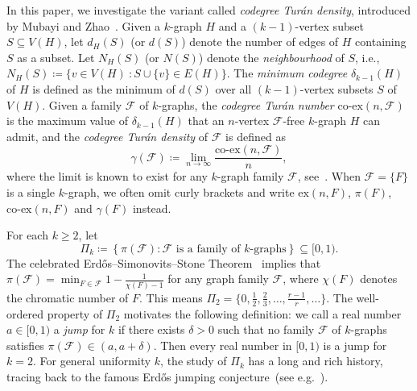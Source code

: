 \documentclass[11pt,a4paper]{article}
\theoremstyle{remark}
\newcommand{\C}[1]{\mathcal{#1}}
\def\ex{\mathrm{ex}}
\def\coex{\mathrm{co\mbox{-}ex}}
\begin{document}
In this paper, we investigate the variant called \emph{codegree Tur\'an density}, introduced by Mubayi and Zhao~\cite{MZ07}. 
Given a $k$-graph $H$ and a $(k-1)$-vertex subset $S\subseteq V(H)$, let $d_H(S)$ (or $d(S)$) denote the number of edges of $H$ containing $S$ as a subset. Let $N_H(S)$ (or $N(S)$) denote the \emph{neighbourhood} of $S$, i.e., $N_H(S)\coloneqq\{ v \in V(H)\ : S\cup \{v\}\in E(H)\}$.
The \textit{minimum codegree} $\delta_{k-1}(H)$ of $H$ is defined as the minimum of $d(S)$ over all $(k-1)$-vertex subsets $S$ of $V(H)$. Given a family $\C F$ of $k$-graphs, the \emph{codegree Tur\'an number} $\coex(n,\C F)$ is the maximum value of $\delta_{k-1}(H)$ that an $n$-vertex $\C F$-free $k$-graph $H$ can admit, and the \emph{codegree Tur\'an density} of $\C F$ is defined as
\[
\gamma(\C F)\coloneqq\lim_{n\to \infty}\frac{\coex(n,\C F)}{n},
\]
where the limit is known to exist for any $k$-graph family $\C F$, see~\cite[Proposition 1.2]{MZ07}. 
When $\C F=\{F\}$ is a single $k$-graph, we often omit curly brackets and write $\ex(n,F)$, $\pi(F)$, $\coex(n,F)$ and $\gamma(F)$ instead. 



For each $k\ge 2$, let
\[
\Pi_k\coloneqq \left\{\pi(\C F) \colon \text{$\C F$ is a family of $k$-graphs}\right\}\subseteq [0,1).
\]
The celebrated Erd\H{o}s--Simonovits--Stone Theorem~\cite{ES66,ES46} implies that $\pi(\C F)=\min_{F\in \C F}1-\frac{1}{\chi(F)-1}$ for any graph family $\C F$, where $\chi(F)$ denotes the chromatic number of $F$. This means $\Pi_2=\{0,\frac{1}{2},\frac{2}{3},\dots,
\frac{r-1}{r},\dots\}$. The well-ordered property of $\Pi_2$ motivates the following definition: we call a real number $a\in [0,1)$ a \emph{jump} for $k$ if there exists $\delta>0$ such that no family $\C F$ of $k$-graphs satisfies $\pi (\C F)\in (a,a+\delta)$. Then every real number in $[0,1)$ is a jump for $k=2$. For general uniformity $k$, the study of $\Pi_k$ has a long and rich history, tracing back to the famous Erd\H{o}s jumping conjecture~(see e.g.~\cite{FR84,FPRT07,BT11,P14,CS25}).
\end{document}
